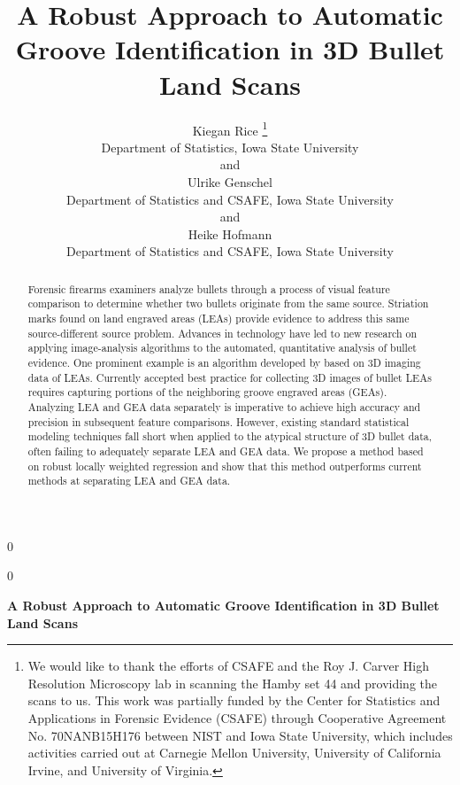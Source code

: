 \documentclass[12pt]{article}
\newcommand{\blind}{0}
\begin{document}
\def\spacingset#1{\renewcommand{\baselinestretch}%
{#1}\small\normalsize} \spacingset{1}




\blind
{
  \title{\bf A Robust Approach to Automatic Groove Identification in 3D Bullet Land
Scans}

  \author{
        Kiegan Rice \thanks{We would like to thank the efforts of CSAFE and the Roy J. Carver High
Resolution Microscopy lab in scanning the Hamby set 44 and providing the
scans to us. This work was partially funded by the Center for Statistics
and Applications in Forensic Evidence (CSAFE) through Cooperative
Agreement No. 70NANB15H176 between NIST and Iowa State University, which
includes activities carried out at Carnegie Mellon University,
University of California Irvine, and University of Virginia.} \\
    Department of Statistics, Iowa State University\\
     and \\     Ulrike Genschel \\
    Department of Statistics and CSAFE, Iowa State University\\
     and \\     Heike Hofmann \\
    Department of Statistics and CSAFE, Iowa State University\\
      }
  \maketitle
} \fi

\blind
{
  \bigskip
  \bigskip
  \bigskip
  \begin{center}
    {\LARGE\bf A Robust Approach to Automatic Groove Identification in 3D Bullet Land
Scans}
  \end{center}
  \medskip
} \fi

\bigskip
\begin{abstract}
Forensic firearms examiners analyze bullets through a process of visual
feature comparison to determine whether two bullets originate from the
same source. Striation marks found on land engraved areas (LEAs) provide
evidence to address this same source-different source problem. Advances
in technology have led to new research on applying image-analysis
algorithms to the automated, quantitative analysis of bullet evidence.
One prominent example is an algorithm developed by \citep{Hare1} based
on 3D imaging data of LEAs. Currently accepted best practice for
collecting 3D images of bullet LEAs requires capturing portions of the
neighboring groove engraved areas (GEAs). Analyzing LEA and GEA data
separately is imperative to achieve high accuracy and precision in
subsequent feature comparisons. However, existing standard statistical
modeling techniques fall short when applied to the atypical structure of
3D bullet data, often failing to adequately separate LEA and GEA data.
We propose a method based on robust locally weighted regression and show
that this method outperforms current methods at separating LEA and GEA
data.
\end{abstract}
\end{document}
